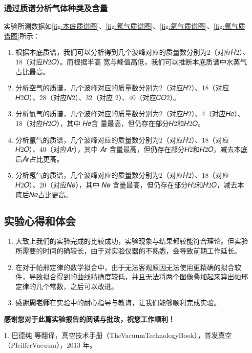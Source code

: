 \documentclass[dvipsnames, svgnames,a4paper,11pt]{article}
\begin{document}
	
	\subsubsection{通过质谱分析气体种类及含量  }
	实验所测数据如\cref{fig:本底质谱图}、\cref{fig:氖气质谱图}、\cref{fig:氦气质谱图}、\cref{fig:氩气质谱图}所示：
	\begin{enumerate}
		
		\item 根据本底质谱，我们可以分析得到几个波峰对应的质量数分别为2（对应𝐻2）、18（对应𝐻2𝑂）。而根据半高
		宽与峰值高低，我们可以推断本底质谱中水蒸气占比最高。 
		\item 分析空气的质谱，几个波峰对应的质量数分别为2（对应𝐻2）、18（对应𝐻2𝑂）、28（对应𝑁2）、32（对应
		2）、40（对应𝐶𝑂2）。
		\item 分析氦气的质谱，几个波峰对应的质量数分别为2（对应𝐻2）、4（对应𝐻𝑒）、18（对应𝐻2𝑂），其中 𝐻𝑒含
		量最高，但仍存在部分𝐻2和𝐻2𝑂。
		\item 分析氩气的质谱，几个波峰对应的质量数分别为2（对应𝐻2）、18（对应𝐻2𝑂）、40（对应𝐴𝑟），其中 𝐴𝑟
		含量最高，但仍存在部分𝐻2和𝐻2𝑂，减去本底后𝐴𝑟占比更高。
		\item 分析氖气的质谱，几个波峰对应的质量数分别为2（对应𝐻2）、18（对应𝐻2𝑂）、20（对应𝑁𝑒），其中 𝑁𝑒
		含量最高，但仍存在部分𝐻2和𝐻2𝑂，减去本底后𝑁𝑒占比更高。
	\end{enumerate}

	\subsection{实验心得和体会}
	\begin{enumerate}
		\item 大致上我们的实验完成的比较成功，实验现象与结果都较能符合理论。但实验所需要的时间的确较长，由于对实验仪器的不熟悉，会导致前期工作延长。
		\item 在对于帕邢定律的数学拟合中，由于无法客观原因无法使用更精确的拟合软件，导致拟合得到的曲线精确度较低，并且无法将两个图像叠加起来算出帕邢定律的几个常数，之后可以改进。
		\item 感谢\textbf{周老师}在实验中的耐心指导与教诲，让我们能够顺利完成实验。
	\end{enumerate}
	\quad \large \textbf{感谢您对于此篇实验报告的阅读与批改，祝您工作顺利！}
\clearpage


{}
1. 巴德纯 等翻译，真空技术手册（TheVacuumTechnologyBook），普发真空（PfeifferVacuum），2013 年。
\end{document}
